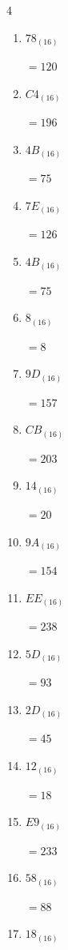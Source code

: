\begin{multicols}{4}
\begin{enumerate}
  \item $78_{(16)}$

        $=120$

  \item $C4_{(16)}$

        $=196$

  \item $4B_{(16)}$

        $=75$

  \item $7E_{(16)}$

        $=126$

  \item $4B_{(16)}$

        $=75$

  \item $8_{(16)}$

        $=8$

  \item $9D_{(16)}$

        $=157$

  \item $CB_{(16)}$

        $=203$

  \item $14_{(16)}$

        $=20$

  \item $9A_{(16)}$

        $=154$

  \item $EE_{(16)}$

        $=238$

  \item $5D_{(16)}$

        $=93$

  \item $2D_{(16)}$

        $=45$

  \item $12_{(16)}$

        $=18$

\columnbreak %

  \item $E9_{(16)}$

        $=233$

  \item $58_{(16)}$

        $=88$

  \item $18_{(16)}$


\end{enumerate}
\end{multicols}

